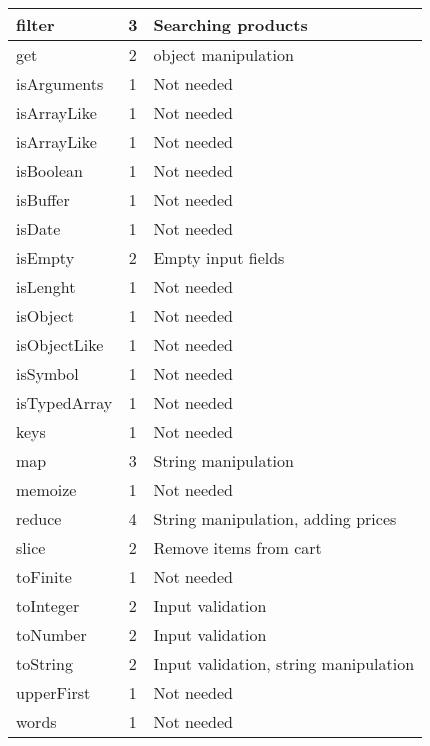 \documentclass[a4paper, 12pt]{article}
\begin{document}
\begin{table}[h]
\begin{tabular}{l|c|l}
    filter       & 3                 & Searching products                    \\ \hline
    get          & 2                 & object manipulation                   \\ \hline
    isArguments  & 1                 & Not needed                            \\ \hline
    isArrayLike  & 1                 & Not needed                            \\ \hline
    isArrayLike  & 1                 & Not needed                            \\ \hline
    isBoolean    & 1                 & Not needed                            \\ \hline
    isBuffer     & 1                 & Not needed                            \\ \hline
    isDate       & 1                 & Not needed                            \\ \hline
    isEmpty      & 2                 & Empty input fields                    \\ \hline
    isLenght     & 1                 & Not needed                            \\ \hline
    isObject     & 1                 & Not needed                            \\ \hline
    isObjectLike & 1                 & Not needed                            \\ \hline
    isSymbol     & 1                 & Not needed                            \\ \hline
    isTypedArray & 1                 & Not needed                            \\ \hline
    keys         & 1                 & Not needed                            \\ \hline
    map          & 3                 & String manipulation                   \\ \hline
    memoize      & 1                 & Not needed                            \\ \hline
    reduce       & 4                 & String manipulation, adding prices    \\ \hline
    slice        & 2                 & Remove items from cart                \\ \hline
    toFinite     & 1                 & Not needed                            \\ \hline
    toInteger    & 2                 & Input validation                      \\ \hline
    toNumber     & 2                 & Input validation                      \\  \hline
    toString     & 2                 & Input validation, string manipulation \\ \hline
    upperFirst   & 1                 & Not needed                            \\ \hline
    words        & 1                 & Not needed                           
    \end{tabular}
    \end{table}








            
\end{document}

